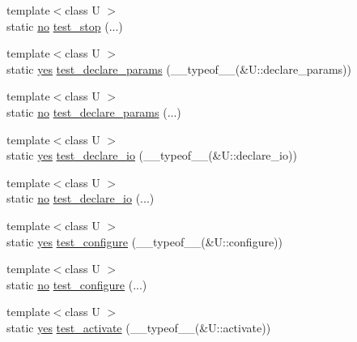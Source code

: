 \begin{DoxyCompactItemize}
{\footnotesize template$<$class U $>$ }\\static \hyperlink{structecto_1_1has__f_ae0c6da775cf20caed616e24681af2807}{no} \hyperlink{structecto_1_1has__f_a97d550e44f5260b40ddd0722bdd6f274}{test\-\_\-stop} (...)
\item 
{\footnotesize template$<$class U $>$ }\\static \hyperlink{structecto_1_1has__f_a3fb902f1eed02919195aff1a6b28eb76}{yes} \hyperlink{structecto_1_1has__f_ae63216bd7936dc02af86363f8db74b2e}{test\-\_\-declare\-\_\-params} (\-\_\-\-\_\-typeof\-\_\-\-\_\-(\&U\-::declare\-\_\-params))
\item 
{\footnotesize template$<$class U $>$ }\\static \hyperlink{structecto_1_1has__f_ae0c6da775cf20caed616e24681af2807}{no} \hyperlink{structecto_1_1has__f_ab2f2693b1d6084a672893777893b9ab2}{test\-\_\-declare\-\_\-params} (...)
\item 
{\footnotesize template$<$class U $>$ }\\static \hyperlink{structecto_1_1has__f_a3fb902f1eed02919195aff1a6b28eb76}{yes} \hyperlink{structecto_1_1has__f_a042de0d066c5b000186594964deea94e}{test\-\_\-declare\-\_\-io} (\-\_\-\-\_\-typeof\-\_\-\-\_\-(\&U\-::declare\-\_\-io))
\item 
{\footnotesize template$<$class U $>$ }\\static \hyperlink{structecto_1_1has__f_ae0c6da775cf20caed616e24681af2807}{no} \hyperlink{structecto_1_1has__f_ad144a46699c480e7851fbd36394a1fe3}{test\-\_\-declare\-\_\-io} (...)
\item 
{\footnotesize template$<$class U $>$ }\\static \hyperlink{structecto_1_1has__f_a3fb902f1eed02919195aff1a6b28eb76}{yes} \hyperlink{structecto_1_1has__f_a6665bfebbc796527bc1a775803ebd18e}{test\-\_\-configure} (\-\_\-\-\_\-typeof\-\_\-\-\_\-(\&U\-::configure))
\item 
{\footnotesize template$<$class U $>$ }\\static \hyperlink{structecto_1_1has__f_ae0c6da775cf20caed616e24681af2807}{no} \hyperlink{structecto_1_1has__f_afc5065e1043ffe865662840f3a9d82fd}{test\-\_\-configure} (...)
\item 
{\footnotesize template$<$class U $>$ }\\static \hyperlink{structecto_1_1has__f_a3fb902f1eed02919195aff1a6b28eb76}{yes} \hyperlink{structecto_1_1has__f_a2212643cf55b3264654bc654df699cb7}{test\-\_\-activate} (\-\_\-\-\_\-typeof\-\_\-\-\_\-(\&U\-::activate))
\item 

\end{DoxyCompactItemize}
